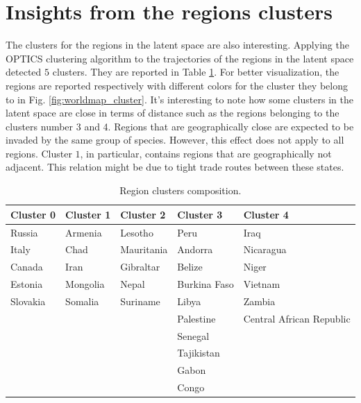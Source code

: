 \documentclass[mscthesis]{usiinfthesis}
\begin{document}
\section{Insights from the regions clusters}

The clusters for the regions in the latent space are also interesting. Applying the OPTICS clustering algorithm to the trajectories of the regions in the latent space detected $5$ clusters. They are reported in Table \ref{table:clusters_region}. For better visualization, the regions are reported respectively with different colors for the cluster they belong to in Fig. \ref{fig:worldmap_cluster}.  It's interesting to note how some clusters in the latent space are close in terms of distance such as the regions belonging to the clusters number 3 and 4. Regions that are geographically close are expected to be invaded by the same group of species. However, this effect does not apply to all regions. Cluster $1$, in particular, contains regions that are geographically not adjacent. This relation might be due to tight trade routes between these states.


\begin{table}[H]
\centering
\begin{tabular}{|l|l|l|l|l|}
\hline
Cluster 0 & Cluster 1                 & Cluster 2  & Cluster 3           & Cluster 4                \\ \hline
Russia    & Armenia                   & Lesotho    & Peru                & Iraq                     \\ \hline
Italy     & Chad                      & Mauritania & Andorra             & Nicaragua                \\ \hline
Canada    & Iran  & Gibraltar  & Belize              & Niger                    \\ \hline
Estonia   & Mongolia                  & Nepal      & Burkina Faso        & Vietnam                  \\ \hline
Slovakia  & Somalia                   & Suriname   & Libya               & Zambia                   \\ \hline
          &                           &            & Palestine & Central African Republic \\ \hline
          &                           &            & Senegal             &                          \\ \hline
          &                           &            & Tajikistan          &                          \\ \hline
          &                           &            & Gabon               &                          \\ \hline
          &                           &            & Congo               &                          \\ \hline
\end{tabular}
\caption{Region clusters composition.}
\label{table:clusters_region}
\end{table}
\end{document}
